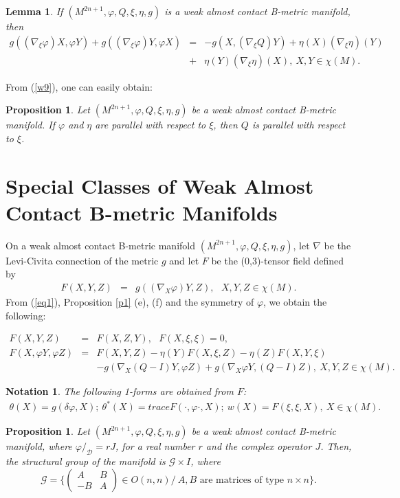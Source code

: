 \documentclass{article}
\newtheorem{lemma}[theorem]{Lemma}
\newtheorem{notation}[theorem]{Notation}
\newtheorem{proposition}[theorem]{Proposition}
\begin{document}
\begin{lemma}
If $(M^{2n+1},\varphi,Q,\xi,\eta, g)$ is a weak almost contact B-metric manifold, then	
\begin{eqnarray}
	g((\nabla_{\xi}\varphi)X,\varphi Y)+g((\nabla_{\xi}\varphi)Y,\varphi X)&=&-g(X,(\nabla_{\xi}Q)Y)+\eta(X)(\nabla_{\xi}\eta)(Y) \nonumber\\
	&+&\eta(Y)(\nabla_{\xi}\eta)(X), \ X,Y\in\chi(M). \label{w9}
\end{eqnarray}
\end{lemma}
From (\ref{w9}), one can easily obtain:
\begin{proposition}
Let $(M^{2n+1},\varphi,Q,\xi,\eta, g)$ be a weak almost contact B-metric manifold. If $\varphi$ and $\eta$ are parallel with respect to $\xi$, then $Q$ is parallel with respect to $\xi$.	
\end{proposition}
	 
\section{Special Classes of Weak Almost Contact B-metric Manifolds}

On a weak almost contact B-metric manifold $(M^{2n+1},\varphi,Q,\xi,\eta, g)$, let $\nabla$ be the Levi-Civita connection of the metric $g$ and let $F$ be the (0,3)-tensor field defined by 
\begin{eqnarray}
	F(X,Y,Z)&=& g((\nabla_X\varphi)Y,Z), \ \ \ X,Y,Z\in\chi(M). \nonumber 
\end{eqnarray}
From (\ref{eq1}), Proposition \ref{p1} (e), (f) and the symmetry of $\varphi$, we obtain the following:

\begin{eqnarray}
	F(X,Y,Z)&=&F(X,Z,Y), \ \ \ F(X,\xi,\xi)=0,\label{f1}\\
	F(X,\varphi Y,\varphi Z)&=&F(X,Y,Z)-\eta(Y)F(X,\xi,Z)-\eta(Z)F(X,Y,\xi)\label{f2}\\
&&	-g(\nabla_X(Q-I)Y,\varphi Z)+g(\nabla_X\varphi Y,(Q-I)Z), \ X,Y,Z\in\chi(M). \nonumber
\end{eqnarray}

\begin{notation}
	The following 1-forms are obtained from $F$:
	\begin{eqnarray}
		\theta(X)=g(\delta\varphi,X); \ \theta^{*}(X)=traceF(\cdot,\varphi\cdot,X); \ w(X)=F(\xi,\xi,X), \ X\in\chi(M).
	\end{eqnarray}
\end{notation}
\begin{proposition} \label{p6}
Let $(M^{2n+1},\varphi,Q,\xi,\eta, g)$ be a weak almost contact B-metric manifold, where $\varphi\slash_{\mathcal{D}}=rJ$, for a real number $r$ and the complex operator $J$. Then, the structural group of the manifold is $\mathcal{G}\times I$, where $$\mathcal{G}=\{\begin{pmatrix}
	A & B  \\
	-B & A   
\end{pmatrix}\in O(n,n) \slash \ A,B\text{ are matrices of type } n\times n  \}.$$	
\end{proposition}
\end{document}
